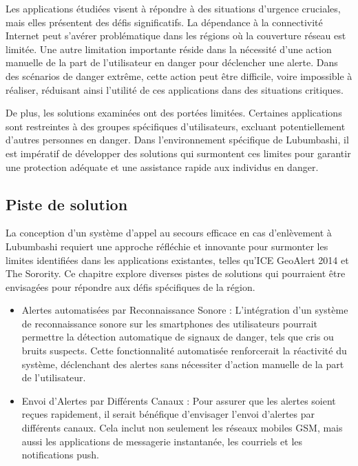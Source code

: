 Les applications étudiées visent à répondre à des situations d'urgence cruciales, mais elles présentent des défis significatifs. La dépendance à la connectivité Internet peut s'avérer problématique dans les régions où la couverture réseau est limitée. Une autre limitation importante réside dans la nécessité d'une action manuelle de la part de l'utilisateur en danger pour déclencher une alerte. Dans des scénarios de danger extrême, cette action peut être difficile, voire impossible à réaliser, réduisant ainsi l'utilité de ces applications dans des situations critiques.

De plus, les solutions examinées ont des portées limitées. Certaines applications sont restreintes à des groupes spécifiques d'utilisateurs, excluant potentiellement d'autres personnes en danger.
Dans l'environnement spécifique de Lubumbashi, il est impératif de développer des solutions qui surmontent ces limites pour garantir une protection adéquate et une assistance rapide aux individus en danger.

\subsection{Piste de solution}

La conception d'un système d'appel au secours efficace en cas d'enlèvement à Lubumbashi requiert une approche réfléchie et innovante pour surmonter les limites identifiées dans les applications existantes, telles qu'ICE GeoAlert 2014 et The Sorority. Ce chapitre explore diverses pistes de solutions qui pourraient être envisagées pour répondre aux défis spécifiques de la région.

\begin{itemize}
	\item Alertes automatisées par Reconnaissance Sonore : L'intégration d'un système de reconnaissance sonore sur les smartphones des utilisateurs pourrait permettre la détection automatique de signaux de danger, tels que cris ou bruits suspects. Cette fonctionnalité automatisée renforcerait la réactivité du système, déclenchant des alertes sans nécessiter d'action manuelle de la part de l'utilisateur.
	
	\item Envoi d'Alertes par Différents Canaux : Pour assurer que les alertes soient reçues rapidement, il serait bénéfique d'envisager l'envoi d'alertes par différents canaux. Cela inclut non seulement les réseaux mobiles GSM, mais aussi les applications de messagerie instantanée, les courriels et les notifications push.
\end{itemize}

